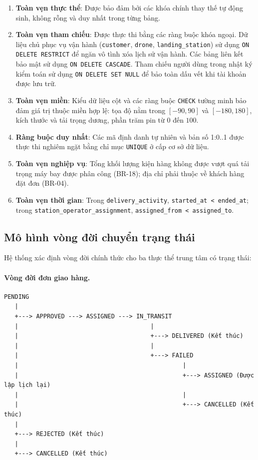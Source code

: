 \begin{enumerate}
    \item \textbf{Toàn vẹn thực thể}: Được bảo đảm bởi các khóa chính thay thế tự động sinh, không rỗng và duy nhất trong từng bảng.
    \item \textbf{Toàn vẹn tham chiếu}: Được thực thi bằng các ràng buộc khóa ngoại. Dữ liệu chủ phục vụ vận hành (\texttt{customer}, \texttt{drone}, \texttt{landing\_station}) sử dụng \texttt{ON DELETE RESTRICT} để ngăn vô tình xóa lịch sử vận hành. Các bảng liên kết bảo mật sử dụng \texttt{ON DELETE CASCADE}. Tham chiếu người dùng trong nhật ký kiểm toán sử dụng \texttt{ON DELETE SET NULL} để bảo toàn dấu vết khi tài khoản được lưu trữ.
    \item \textbf{Toàn vẹn miền}: Kiểu dữ liệu cột và các ràng buộc \texttt{CHECK} tường minh bảo đảm giá trị thuộc miền hợp lệ: tọa độ nằm trong $[-90, 90]$ và $[-180, 180]$, kích thước và tải trọng dương, phần trăm pin từ $0$ đến $100$.
    \item \textbf{Ràng buộc duy nhất}: Các mã định danh tự nhiên và bản số 1:0..1 được thực thi nghiêm ngặt bằng chỉ mục \texttt{UNIQUE} ở cấp cơ sở dữ liệu.
    \item \textbf{Toàn vẹn nghiệp vụ}: Tổng khối lượng kiện hàng không được vượt quá tải trọng máy bay được phân công (BR-18); địa chỉ phải thuộc về khách hàng đặt đơn (BR-04).
    \item \textbf{Toàn vẹn thời gian}: Trong \texttt{delivery\_activity}, \texttt{started\_at < ended\_at}; trong \texttt{station\_operator\_assignment}, \texttt{assigned\_from < assigned\_to}.
\end{enumerate}

\subsection{Mô hình vòng đời chuyển trạng thái}\label{s:lifecycle}

Hệ thống xác định vòng đời chính thức cho ba thực thể trung tâm có trạng thái:

\paragraph{Vòng đời đơn giao hàng.}
\begin{verbatim}
PENDING
   |
   +---> APPROVED ---> ASSIGNED ---> IN_TRANSIT
   |                                     |
   |                                     +---> DELIVERED (Kết thúc)
   |                                     |
   |                                     +---> FAILED
   |                                              |
   |                                              +---> ASSIGNED (Được lập lịch lại)
   |                                              |
   |                                              +---> CANCELLED (Kết thúc)
   |
   +---> REJECTED (Kết thúc)
   |
   +---> CANCELLED (Kết thúc)
\end{verbatim}

